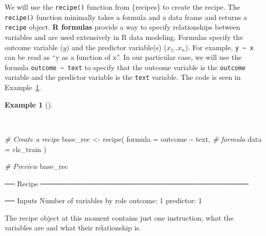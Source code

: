 \documentclass[
  letterpaper,
]{book}
\newenvironment{Shaded}{\begin{snugshade}}{\end{snugshade}}
\newcommand{\AttributeTok}[1]{\textcolor[rgb]{0.00,0.00,0.00}{#1}}
\newcommand{\CommentTok}[1]{\textcolor[rgb]{0.00,0.00,0.00}{\textit{#1}}}
\newcommand{\FunctionTok}[1]{\textcolor[rgb]{0.00,0.00,0.00}{#1}}
\newcommand{\NormalTok}[1]{\textcolor[rgb]{0.00,0.00,0.00}{#1}}
\newcommand{\OtherTok}[1]{\textcolor[rgb]{0.00,0.00,0.00}{#1}}
\newcommand{\SpecialCharTok}[1]{\textcolor[rgb]{0.00,0.00,0.00}{#1}}
\theoremstyle{definition}
\newtheorem{example}{Example}[chapter]
\theoremstyle{remark}
\begin{document}
We will use the \texttt{recipe()} function from \{recipes\} to create
the recipe. The \texttt{recipe()} function minimally takes a formula and
a data frame and returns a \texttt{recipe} object. \textbf{R formulas}
provide a way to specify relationships between variables and are used
extensively in R data modeling. Formulas specify the outcome variable
(\(y\)) and the predictor variable(s) (\(x_1 .. x_n\)). For example,
\texttt{y\ \textasciitilde{}\ x} can be read as ``y as a function of
x''. In our particular case, we will use the formula
\texttt{outcome\ \textasciitilde{}\ text} to specify that the outcome
variable is the \texttt{outcome} variable and the predictor variable is
the \texttt{text} variable. The code is seen in
Example~\ref{exm-predict-class-recipe}.

\begin{example}[]\protect\hypertarget{exm-predict-class-recipe}{}\label{exm-predict-class-recipe}

~

\begin{Shaded}
\begin{Highlighting}[]
\CommentTok{\# Create a recipe}
\NormalTok{base\_rec }\OtherTok{\textless{}{-}}
  \FunctionTok{recipe}\NormalTok{(}
    \AttributeTok{formula =}\NormalTok{ outcome }\SpecialCharTok{\textasciitilde{}}\NormalTok{ text, }\CommentTok{\# formula}
    \AttributeTok{data =}\NormalTok{ cls\_train}
\NormalTok{    )}

\CommentTok{\# Preview}
\NormalTok{base\_rec}
\end{Highlighting}
\end{Shaded}

\begin{Shaded}
\begin{Highlighting}[]
\NormalTok{── Recipe ─────────────────────────────────────────}

\NormalTok{── Inputs}
\NormalTok{Number of variables by role}
\NormalTok{outcome:   1}
\NormalTok{predictor: 1}
\end{Highlighting}
\end{Shaded}

\end{example}

The recipe object at this moment contains just one instruction, what the
variables are and what their relationship is.
\end{document}
